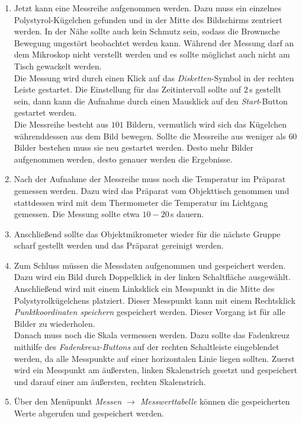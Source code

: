\begin{enumerate}
  \item Jetzt kann eine Messreihe aufgenommen werden. Dazu muss ein einzelnes Polystyrol-Kügelchen gefunden und in der Mitte des Bildschirms zentriert werden. In der Nähe sollte auch kein Schmutz sein, sodass die Brownsche Bewegung ungestört beobachtet werden kann. Während der Messung darf an dem Mikroskop nicht verstellt werden und es sollte möglichst auch nicht am Tisch gewackelt werden.\\
  Die Messung wird durch einen Klick auf das \emph{Disketten}-Symbol in der rechten Leiste gestartet. Die Einstellung für das Zeitintervall sollte auf $2 \,$s gestellt sein, dann kann die Aufnahme durch einen Mausklick auf den \emph{Start}-Button gestartet werden.\\
  Die Messreihe besteht aus $101$ Bildern, vermutlich wird sich das Kügelchen währenddessen aus dem Bild bewegen. Sollte die Messreihe aus weniger als $60$ Bilder bestehen muss sie neu gestartet werden. Desto mehr Bilder aufgenommen werden, desto genauer werden die Ergebnisse.

  \item Nach der Aufnahme der Messreihe muss noch die Temperatur im Präparat gemessen werden. Dazu wird das Präparat vom Objekttisch genommen und stattdessen wird mit dem Thermometer die Temperatur im Lichtgang gemessen. Die Messung sollte etwa $10 - 20\,$s dauern.

  \item Anschließend sollte das Objektmikrometer wieder für die nächste Gruppe scharf gestellt werden und das Präparat gereinigt werden.

  \item Zum Schluss müssen die Messdaten aufgenommen und gespeichert werden.
  Dazu wird ein Bild durch Doppelklick in der linken Schaltfläche ausgewählt. Anschließend wird mit einem Linksklick ein Messpunkt in die Mitte des Polystyrolkügelchens platziert. Dieser Messpunkt kann mit einem Rechtsklick \emph{Punktkoordinaten speichern} gespeichert werden. Dieser Vorgang ist für alle Bilder zu wiederholen.\\
  Danach muss noch die Skala vermessen werden. Dazu sollte das Fadenkreuz mithilfe des \emph{Fadenkreuz-Buttons} auf der rechten Schaltleiste eingeblendet werden, da alle Messpunkte auf einer horizontalen Linie liegen sollten. Zuerst wird ein Messpunkt am äußersten, linken Skalenstrich gesetzt und gespeichert und darauf einer am äußersten, rechten Skalenstrich.\\

  \item Über den Menüpunkt \emph{Messen $\rightarrow$ Messwerttabelle} können die gespeicherten Werte abgerufen und gespeichert werden.

\end{enumerate}
